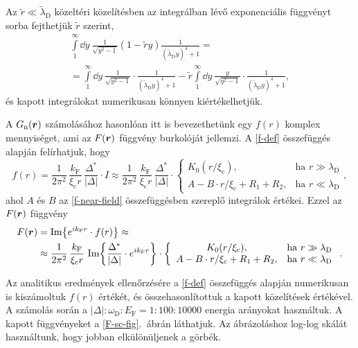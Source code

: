 \documentclass[a4paper,12pt,titlepage]{article}
\newcommand{\RR}{{\vb*{r}}}
\newcommand{\kF}{{k_\text{F}}}
\newcommand{\EF}{{E_\text{F}}}
\newcommand{\xic}{{\xi_\text{c}}}
\begin{document}
Az $\tilde{r} \ll \tilde{\lambda}_\text{D}$ közeltéri közelítésben az integrálban lévő exponenciális függvényt sorba fejthetjük $\tilde{r}$ szerint,
\begin{multline} \label{f-near-field}
	\int\limits_1^\infty \dd{y} ~ \frac{1}{\sqrt{y^2 - 1}} \left( 1 - \tilde{r} y \right) \frac{1}{\left( \tilde{\lambda}_\text{D} y \right)^4 + 1} = \\
	= \int\limits_1^\infty \dd{y} ~ \frac{1}{\sqrt{y^2 - 1}} \cdot \frac{1}{\left( \tilde{\lambda}_\text{D} y \right)^4 + 1} - \tilde{r} \int\limits_1^\infty \dd{y} ~ \frac{y}{\sqrt{y^2 - 1}} \cdot \frac{1}{\left( \tilde{\lambda}_\text{D} y \right)^4 + 1},
\end{multline}
és kapott integrálokat numerikusan könnyen kiértékelhetjük.

A $G_\text{n}(\RR)$ számolásához hasonlóan itt is bevezethetünk egy $f(r)$ komplex mennyiséget, ami az $F(\RR)$ függvény burkolóját jellemzi.  A \eqref{f-def} összefüggés alapján felírhatjuk, hogy
\begin{equation}
	f(r) = \frac{1}{2 \pi^2} \, \frac{\kF}{\xic r} \, \frac{\Delta^*}{\left| \Delta \right|} \cdot I \approx \frac{1}{2 \pi^2} \, \frac{\kF}{\xic r} \, \frac{\Delta^*}{\left| \Delta \right|} \cdot \left\{ \begin{array}{cl}
		K_0(r / \xic), & \text{ha } r \gg \lambda_\text{D} \\
		A - B \cdot r / \xic + R_1 + R_2, & \text{ha } r \ll \lambda_\text{D}
	\end{array} \right. ,
\end{equation}
ahol $A$ és $B$ az \eqref{f-near-field} összefüggésben szereplő integrálok értékei.  Ezzel az $F(\RR)$ függvény
\begin{equation}
\begin{split}
	F(\RR) & = \Im{e^{i \kF r} \cdot f(r)} \approx \\
	& \approx \frac{1}{2 \pi^2} \, \frac{\kF}{\xic r} \, \Im{\frac{\Delta^*}{\left| \Delta \right|} \cdot e^{i \kF r}} \cdot \left\{ \begin{array}{cl}
		K_0(r / \xic), & \text{ha } r \gg \lambda_\text{D} \\
		A - B \cdot r / \xic + R_1 + R_2, & \text{ha } r \ll \lambda_\text{D}
	\end{array} \right. .
\end{split}
\end{equation}

Az analitikus eredmények ellenőrzésére a \eqref{f-def} összefüggés alapján numerikusan is kiszámoltuk $f(r)$ értékét, és összehasonlítottuk a kapott közelítések értékével.  A számolás során a $\left| \Delta \right| : \omega_\text{D} : \EF = 1 : 100 : 10000$ energia arányokat használtuk.  A kapott függvényeket a \ref{F-sc-fig}.\ ábrán láthatjuk.  Az ábrázoláshoz log-log skálát használtunk, hogy jobban elkülönüljenek a görbék.
\end{document}

